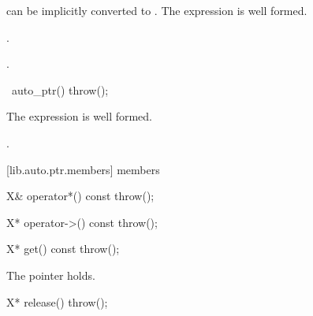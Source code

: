 \begin{itemdescr}
\pnum
\requires
{} can be implicitly converted to . The expression
 is well formed.

\pnum
\effects
{}.

\pnum
\returns
{}.
\end{itemdescr}

%
\begin{itemdecl}
~auto_ptr() throw();
\end{itemdecl}

\begin{itemdescr}
\pnum
\requires
The expression  is well formed.

\pnum
\effects
{}.
\end{itemdescr}

[lib.auto.ptr.members]{ members}

%
\begin{itemdecl}
X& operator*() const throw();
\end{itemdecl}

\begin{itemdescr}
\pnum
\requires
{}

\pnum
\returns
{}
\end{itemdescr}

%
\begin{itemdecl}
X* operator->() const throw();
\end{itemdecl}

\begin{itemdescr}
\pnum
\returns
{}
\end{itemdescr}

%
\begin{itemdecl}
X* get() const throw();
\end{itemdecl}

\begin{itemdescr}
\pnum
\returns
The pointer  holds.
\end{itemdescr}

%
\begin{itemdecl}
X* release() throw();
\end{itemdecl}

